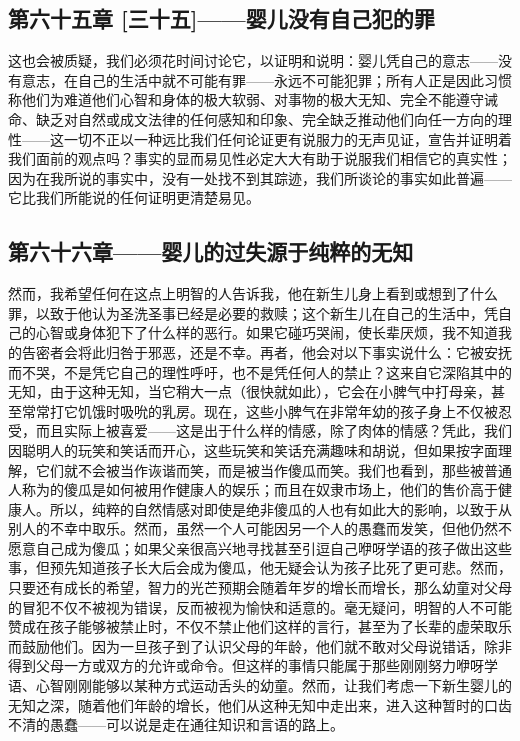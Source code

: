 
\subsection{第六十五章 [三十五]——婴儿没有自己犯的罪}

这也会被质疑，我们必须花时间讨论它，以证明和说明：婴儿凭自己的意志——没有意志，在自己的生活中就不可能有罪——永远不可能犯罪；所有人正是因此习惯称他们为难道他们心智和身体的极大软弱、对事物的极大无知、完全不能遵守诫命、缺乏对自然或成文法律的任何感知和印象、完全缺乏推动他们向任一方向的理性——这一切不正以一种远比我们任何论证更有说服力的无声见证，宣告并证明着我们面前的观点吗？事实的显而易见性必定大大有助于说服我们相信它的真实性；因为在我所说的事实中，没有一处找不到其踪迹，我们所谈论的事实如此普遍——它比我们所能说的任何证明更清楚易见。\par


\subsection{第六十六章——婴儿的过失源于纯粹的无知}

然而，我希望任何在这点上明智的人告诉我，他在新生儿身上看到或想到了什么罪，以致于他认为圣洗圣事已经是必要的救赎；这个新生儿在自己的生活中，凭自己的心智或身体犯下了什么样的恶行。如果它碰巧哭闹，使长辈厌烦，我不知道我的告密者会将此归咎于邪恶，还是不幸。再者，他会对以下事实说什么：它被安抚而不哭，不是凭它自己的理性呼吁，也不是凭任何人的禁止？这来自它深陷其中的无知，由于这种无知，当它稍大一点（很快就如此），它会在小脾气中打母亲，甚至常常打它饥饿时吸吮的乳房。现在，这些小脾气在非常年幼的孩子身上不仅被忍受，而且实际上被喜爱——这是出于什么样的情感，除了肉体的情感？凭此，我们因聪明人的玩笑和笑话而开心，这些玩笑和笑话充满趣味和胡说，但如果按字面理解，它们就不会被当作诙谐而笑，而是被当作傻瓜而笑。我们也看到，那些被普通人称为的傻瓜是如何被用作健康人的娱乐；而且在奴隶市场上，他们的售价高于健康人。所以，纯粹的自然情感对即使是绝非傻瓜的人也有如此大的影响，以致于从别人的不幸中取乐。然而，虽然一个人可能因另一个人的愚蠢而发笑，但他仍然不愿意自己成为傻瓜；如果父亲很高兴地寻找甚至引逗自己咿呀学语的孩子做出这些事，但预先知道孩子长大后会成为傻瓜，他无疑会认为孩子比死了更可悲。然而，只要还有成长的希望，智力的光芒预期会随着年岁的增长而增长，那么幼童对父母的冒犯不仅不被视为错误，反而被视为愉快和适意的。毫无疑问，明智的人不可能赞成在孩子能够被禁止时，不仅不禁止他们这样的言行，甚至为了长辈的虚荣取乐而鼓励他们。因为一旦孩子到了认识父母的年龄，他们就不敢对父母说错话，除非得到父母一方或双方的允许或命令。但这样的事情只能属于那些刚刚努力咿呀学语、心智刚刚能够以某种方式运动舌头的幼童。然而，让我们考虑一下新生婴儿的无知之深，随着他们年龄的增长，他们从这种无知中走出来，进入这种暂时的口齿不清的愚蠢——可以说是走在通往知识和言语的路上。\par

